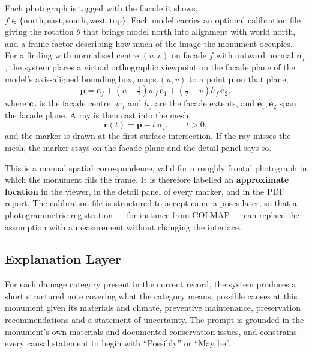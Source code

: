 \documentclass[a4paper,12pt,oneside]{book}
\begin{document}
Each photograph is tagged with the facade it shows, $f \in \{\text{north}, \text{east}, \text{south}, \text{west}, \text{top}\}$. Each model carries an optional calibration file giving the rotation $\theta$ that brings model north into alignment with world north, and a frame factor describing how much of the image the monument occupies. For a finding with normalised centre $(u, v)$ on facade $f$ with outward normal $\mathbf{n}_f$, the system places a virtual orthographic viewpoint on the facade plane of the model's axis-aligned bounding box, maps $(u, v)$ to a point $\mathbf{p}$ on that plane,
\begin{equation}
\mathbf{p} = \mathbf{c}_f + \left(u - \tfrac{1}{2}\right) w_f \,\hat{\mathbf{e}}_1 + \left(\tfrac{1}{2} - v\right) h_f \,\hat{\mathbf{e}}_2 ,
\end{equation}
where $\mathbf{c}_f$ is the facade centre, $w_f$ and $h_f$ are the facade extents, and $\hat{\mathbf{e}}_1, \hat{\mathbf{e}}_2$ span the facade plane. A ray is then cast into the mesh,
\begin{equation}
\mathbf{r}(t) = \mathbf{p} - t\,\mathbf{n}_f, \qquad t > 0 ,
\end{equation}
and the marker is drawn at the first surface intersection. If the ray misses the mesh, the marker stays on the facade plane and the detail panel says so.

This is a manual spatial correspondence, valid for a roughly frontal photograph in which the monument fills the frame. It is therefore labelled an \textbf{approximate location} in the viewer, in the detail panel of every marker, and in the PDF report. The calibration file is structured to accept camera poses later, so that a photogrammetric registration --- for instance from COLMAP \cite{schoenberger2016sfm} --- can replace the assumption with a measurement without changing the interface.

\subsection{Explanation Layer}
For each damage category present in the current record, the system produces a short structured note covering what the category means, possible causes at this monument given its materials and climate, preventive maintenance, preservation recommendations and a statement of uncertainty. The prompt is grounded in the monument's own materials and documented conservation issues, and constrains every causal statement to begin with ``Possibly'' or ``May be''.
\end{document}
